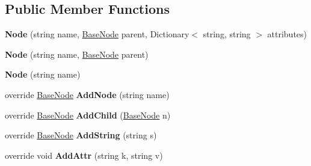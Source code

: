 \subsection*{Public Member Functions}
\begin{DoxyCompactItemize}
\item 
\hypertarget{class_x_m_leru_handleru_1_1_node_af3e096333b8dcc74789ebc04c0984856}{}{\bfseries Node} (string name, \hyperlink{class_x_m_leru_handleru_1_1_base_node}{Base\+Node} parent, Dictionary$<$ string, string $>$ attributes)\label{class_x_m_leru_handleru_1_1_node_af3e096333b8dcc74789ebc04c0984856}

\item 
\hypertarget{class_x_m_leru_handleru_1_1_node_a8060ae6840e807ebf3d3ef7f27a468bf}{}{\bfseries Node} (string name, \hyperlink{class_x_m_leru_handleru_1_1_base_node}{Base\+Node} parent)\label{class_x_m_leru_handleru_1_1_node_a8060ae6840e807ebf3d3ef7f27a468bf}

\item 
\hypertarget{class_x_m_leru_handleru_1_1_node_ad8005a9ca54062189361e811e7064cff}{}{\bfseries Node} (string name)\label{class_x_m_leru_handleru_1_1_node_ad8005a9ca54062189361e811e7064cff}

\item 
\hypertarget{class_x_m_leru_handleru_1_1_node_aa79ab2740c301fca30270de273d1c796}{}override \hyperlink{class_x_m_leru_handleru_1_1_base_node}{Base\+Node} {\bfseries Add\+Node} (string name)\label{class_x_m_leru_handleru_1_1_node_aa79ab2740c301fca30270de273d1c796}

\item 
\hypertarget{class_x_m_leru_handleru_1_1_node_ad6070ed490bfde070bdb07461fd873e1}{}override \hyperlink{class_x_m_leru_handleru_1_1_base_node}{Base\+Node} {\bfseries Add\+Child} (\hyperlink{class_x_m_leru_handleru_1_1_base_node}{Base\+Node} n)\label{class_x_m_leru_handleru_1_1_node_ad6070ed490bfde070bdb07461fd873e1}

\item 
\hypertarget{class_x_m_leru_handleru_1_1_node_a74b20c07c1d044392ae7670d58679c90}{}override \hyperlink{class_x_m_leru_handleru_1_1_base_node}{Base\+Node} {\bfseries Add\+String} (string s)\label{class_x_m_leru_handleru_1_1_node_a74b20c07c1d044392ae7670d58679c90}

\item 
\hypertarget{class_x_m_leru_handleru_1_1_node_af847932f7294cc39d8a3f6f89062a950}{}override void {\bfseries Add\+Attr} (string k, string v)\label{class_x_m_leru_handleru_1_1_node_af847932f7294cc39d8a3f6f89062a950}


\end{DoxyCompactItemize}
